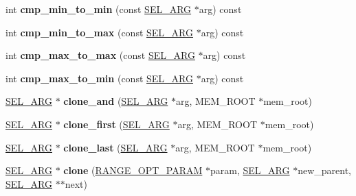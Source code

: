 \begin{DoxyCompactItemize}
\item 
\mbox{\label{classSEL__ARG_afb5180222b590485f70b75fc2cffefe3}} 
int {\bfseries cmp\+\_\+min\+\_\+to\+\_\+min} (const \mbox{\hyperlink{classSEL__ARG}{S\+E\+L\+\_\+\+A\+RG}} $\ast$arg) const
\item 
\mbox{\label{classSEL__ARG_abd363a1e629a08a6803a3fac9dcf0585}} 
int {\bfseries cmp\+\_\+min\+\_\+to\+\_\+max} (const \mbox{\hyperlink{classSEL__ARG}{S\+E\+L\+\_\+\+A\+RG}} $\ast$arg) const
\item 
\mbox{\label{classSEL__ARG_a79f31d4c8c05006b96c423631df16508}} 
int {\bfseries cmp\+\_\+max\+\_\+to\+\_\+max} (const \mbox{\hyperlink{classSEL__ARG}{S\+E\+L\+\_\+\+A\+RG}} $\ast$arg) const
\item 
\mbox{\label{classSEL__ARG_aba67b15f9a4a14d5772a98fe49e45cae}} 
int {\bfseries cmp\+\_\+max\+\_\+to\+\_\+min} (const \mbox{\hyperlink{classSEL__ARG}{S\+E\+L\+\_\+\+A\+RG}} $\ast$arg) const
\item 
\mbox{\label{classSEL__ARG_ada9599b24bca5f796da6208ba841e85c}} 
\mbox{\hyperlink{classSEL__ARG}{S\+E\+L\+\_\+\+A\+RG}} $\ast$ {\bfseries clone\+\_\+and} (\mbox{\hyperlink{classSEL__ARG}{S\+E\+L\+\_\+\+A\+RG}} $\ast$arg, M\+E\+M\+\_\+\+R\+O\+OT $\ast$mem\+\_\+root)
\item 
\mbox{\label{classSEL__ARG_aef57ea5a528feada0037594609a39667}} 
\mbox{\hyperlink{classSEL__ARG}{S\+E\+L\+\_\+\+A\+RG}} $\ast$ {\bfseries clone\+\_\+first} (\mbox{\hyperlink{classSEL__ARG}{S\+E\+L\+\_\+\+A\+RG}} $\ast$arg, M\+E\+M\+\_\+\+R\+O\+OT $\ast$mem\+\_\+root)
\item 
\mbox{\label{classSEL__ARG_a8760797712ba245cadcab72beb60d29f}} 
\mbox{\hyperlink{classSEL__ARG}{S\+E\+L\+\_\+\+A\+RG}} $\ast$ {\bfseries clone\+\_\+last} (\mbox{\hyperlink{classSEL__ARG}{S\+E\+L\+\_\+\+A\+RG}} $\ast$arg, M\+E\+M\+\_\+\+R\+O\+OT $\ast$mem\+\_\+root)
\item 
\mbox{\label{classSEL__ARG_a3df3b1c5ae7df16703f760e04bf9460f}} 
\mbox{\hyperlink{classSEL__ARG}{S\+E\+L\+\_\+\+A\+RG}} $\ast$ {\bfseries clone} (\mbox{\hyperlink{classRANGE__OPT__PARAM}{R\+A\+N\+G\+E\+\_\+\+O\+P\+T\+\_\+\+P\+A\+R\+AM}} $\ast$param, \mbox{\hyperlink{classSEL__ARG}{S\+E\+L\+\_\+\+A\+RG}} $\ast$new\+\_\+parent, \mbox{\hyperlink{classSEL__ARG}{S\+E\+L\+\_\+\+A\+RG}} $\ast$$\ast$next)
$$
\end{DoxyCompactItemize}
